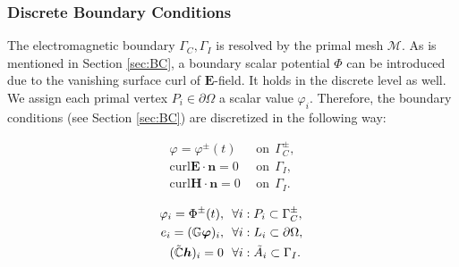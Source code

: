 \documentclass{article}
\begin{document}
\subsubsection{Discrete Boundary Conditions}
The electromagnetic boundary $\Gamma_C, \Gamma_I$ is resolved by the primal mesh $\mathcal{M}$. As is mentioned in Section \ref{sec:BC}, a boundary scalar potential $\Phi$ can be introduced due to the vanishing surface curl of $\mathbf{E}$-field. It holds in the discrete level as well. We assign each primal vertex $P_i \in \partial\Omega$ a scalar value $\varphi_i$. Therefore, the boundary conditions (see Section \ref{sec:BC}) are discretized in the following way:
\begin{center}
    \vspace{-0.5cm}
    \begin{minipage}{0.3\textwidth}
    \begin{align*}
    \varphi = \varphi^\pm(t)\ \ &\text{on} \ \ \Gamma_C^\pm, \\
    \text{curl} \mathbf{E} \cdot \mathbf{n} = 0\ \ &\text{on} \ \  \Gamma_I,  \\
    \text{curl} \mathbf{H} \cdot \mathbf{n} = 0\ \  &\text{on} \ \  \Gamma_I.\
    \end{align*}
    \end{minipage}
    \begin{minipage}{0.1\textwidth}
    \centering
    \end{minipage}
    \begin{minipage}{0.4\textwidth}
        \begin{subequations}
            \begin{align}
            \varphi_i = \Phi^\pm(t), \ \ &\forall i : P_i \subset \Gamma_C^\pm, \label{equ:bc_1}\\
            e_i = (\mathbb{G}\bm{\varphi})_i,\ \ &\forall i : L_i \subset \partial\Omega, \label{equ:bc_2}\\
            (\Tilde{\mathbb{C}} \bm{h})_i = 0\ \ &\forall i : \Tilde{A}_i \subset \Gamma_I.\label{equ:bc_3}\
            \end{align}
        \end{subequations}
    \end{minipage}
\end{center}
\end{document}
